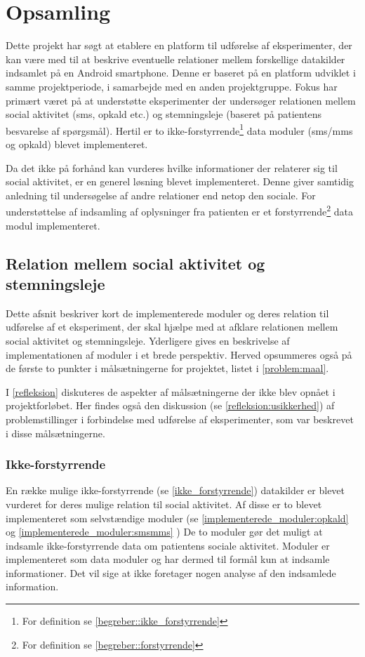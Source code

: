\chapter{Opsamling}
Dette projekt har søgt at etablere en platform til udførelse af eksperimenter, der kan være med til at beskrive eventuelle relationer mellem forskellige datakilder indsamlet på en Android smartphone.
Denne er baseret på en platform\citefaelles{} udviklet i samme projektperiode, i samarbejde med en anden projektgruppe.
Fokus har primært været på at understøtte eksperimenter der undersøger relationen mellem social aktivitet (sms, opkald etc.) og stemningsleje (baseret på patientens besvarelse af spørgsmål).
Hertil er to ikke-forstyrrende\footnote{For definition se \cref{begreber::ikke_forstyrrende}} data moduler (sms/mms og opkald) blevet implementeret.

Da det ikke på forhånd kan vurderes hvilke informationer der relaterer sig til social aktivitet, er en generel løsning blevet implementeret.
Denne giver samtidig anledning til undersøgelse af andre relationer end netop den sociale.
For understøttelse af indsamling af oplysninger fra patienten er et forstyrrende\footnote{For definition se \cref{begreber::forstyrrende}} data modul implementeret.


\section{Relation mellem social aktivitet og stemningsleje}
Dette afsnit beskriver kort de implementerede moduler og deres relation til udførelse af et eksperiment, der skal hjælpe med at afklare relationen mellem social aktivitet og stemningsleje.
Yderligere gives en beskrivelse af implementationen af moduler i et brede perspektiv.
Herved opsummeres også på de første to punkter i målsætningerne for projektet, listet i \cref{problem:maal}.

I \cref{refleksion} diskuteres de aspekter af målsætningerne der ikke blev opnået i projektforløbet.
Her findes også den diskussion (se \cref{refleksion:usikkerhed}) af problemstillinger i forbindelse med udførelse af eksperimenter, som var beskrevet i disse målsætningerne.

\subsection{Ikke-forstyrrende}
En række mulige ikke-forstyrrende (se \cref{ikke_forstyrrende}) datakilder er blevet vurderet for deres mulige relation til social aktivitet.
Af disse er to blevet implementeret som selvstændige moduler (se \cref{implementerede_moduler:opkald}  og \cref{implementerede_moduler:smsmms} )
De to moduler gør det muligt at indsamle ikke-forstyrrende data om patientens sociale aktivitet.
Moduler er implementeret som data moduler og har dermed til formål kun at indsamle informationer.
Det vil sige at ikke foretager nogen analyse af den indsamlede information.

